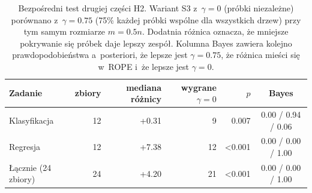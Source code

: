 \begin{table}[!htbp]
\centering\small
\caption{Bezpośredni test drugiej części H2. Wariant S3 z~$\gamma=0$ (próbki niezależne) porównano z~$\gamma=0.75$ (75\% każdej próbki wspólne dla wszystkich drzew) przy tym samym rozmiarze $m=0.5n$. Dodatnia różnica oznacza, że mniejsze pokrywanie się próbek daje lepszy zespół. Kolumna Bayes zawiera kolejno prawdopodobieństwa a~posteriori, że lepsze jest $\gamma=0.75$, że różnica mieści się w~ROPE i~że lepsze jest $\gamma=0$.}
\label{tab:s3}
\begin{tabular}{lrrrrc}
\toprule
\textbf{Zadanie} & \textbf{zbiory} & \textbf{mediana różnicy} & \textbf{wygrane $\gamma=0$} & $p$ & \textbf{Bayes} \\
\midrule
Klasyfikacja & 12 & +0.31 & 9 & 0.007 & 0.00 / 0.94 / 0.06 \\
Regresja & 12 & +7.38 & 12 & <0.001 & 0.00 / 0.00 / 1.00 \\
Łącznie (24 zbiory) & 24 & +4.20 & 21 & <0.001 & 0.00 / 0.00 / 1.00 \\
\bottomrule
\end{tabular}
\end{table}
